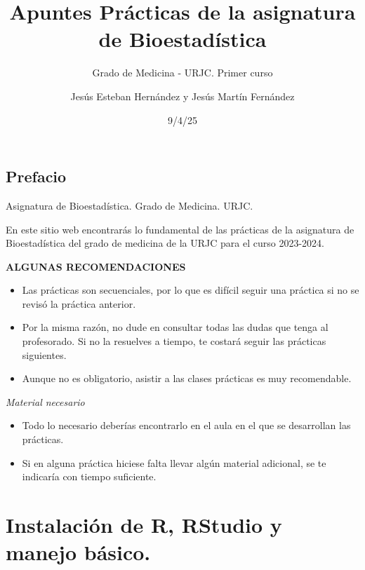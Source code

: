 \documentclass[
  letterpaper,
]{scrbook}
\title{Apuntes Prácticas de la asignatura de Bioestadística}
\subtitle{Grado de Medicina - URJC. Primer curso}
\author{Jesús Esteban Hernández y Jesús Martín Fernández}
\date{9/4/25}
\renewcommand*\contentsname{Tabla de contenidos}
\newcommand\contentsname{Tabla de contenidos}
\begin{document}
\frontmatter
\maketitle
\ifdefined\Shaded\renewenvironment{Shaded}{\begin{tcolorbox}[enhanced, boxrule=0pt, frame hidden, breakable, interior hidden, borderline west={3pt}{0pt}{shadecolor}, sharp corners]}{\end{tcolorbox}}\fi

\renewcommand*\contentsname{Tabla de contenidos}
{
\setcounter{tocdepth}{2}
\tableofcontents
}
\mainmatter
{}

\hypertarget{prefacio}{%
\chapter{\texorpdfstring{{Prefacio}}{Prefacio}}\label{prefacio}}

Asignatura de Bioestadística. Grado de Medicina. URJC.

\hfill\break

En este sitio web encontrarás lo fundamental de las prácticas de la
asignatura de Bioestadística del grado de medicina de la URJC para el
curso 2023-2024.

\textbf{ALGUNAS RECOMENDACIONES}

\begin{itemize}
\item
  Las prácticas son secuenciales, por lo que es difícil seguir una
  práctica si no se revisó la práctica anterior.
\item
  Por la misma razón, no dude en consultar todas las dudas que tenga al
  profesorado. Si no la resuelves a tiempo, te costará seguir las
  prácticas siguientes.
\item
  Aunque no es obligatorio, asistir a las clases prácticas es muy
  recomendable.
\end{itemize}

\emph{Material necesario}

\begin{itemize}
\item
  Todo lo necesario deberías encontrarlo en el aula en el que se
  desarrollan las prácticas.
\item
  Si en alguna práctica hiciese falta llevar algún material adicional,
  se te indicaría con tiempo suficiente.
\end{itemize}

\part{Instalación de R, RStudio y manejo básico.}
\end{document}
